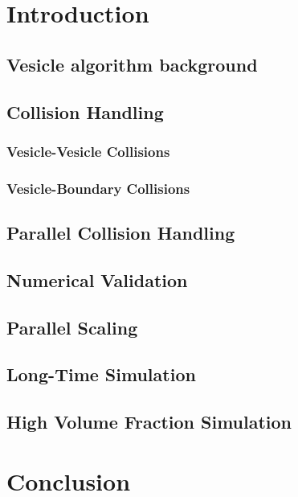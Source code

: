 \section{Introduction}
\subsection{Vesicle algorithm background}

\subsection{Collision Handling}

\subsubsection{Vesicle-Vesicle Collisions}
\subsubsection{Vesicle-Boundary Collisions}

\subsection{Parallel Collision Handling}

\subsection{Numerical Validation}

\subsection{Parallel Scaling}

\subsection{Long-Time Simulation}

\subsection{High Volume Fraction Simulation}

\section{Conclusion}

